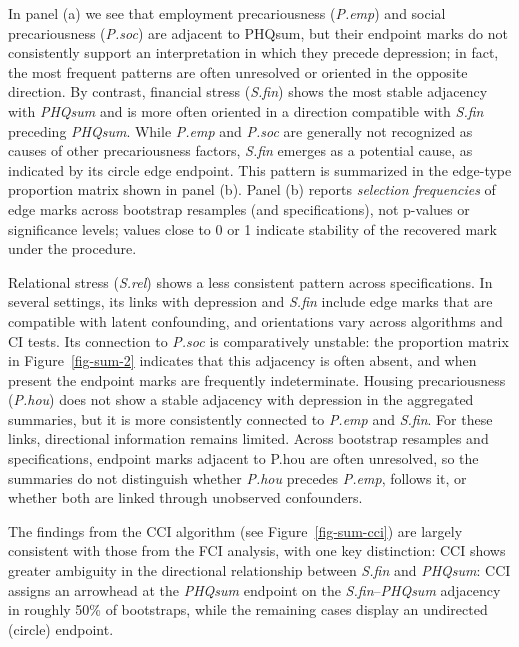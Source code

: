 \documentclass[
]{article}
\begin{document}
\textcolor{BrickRed}{In panel (a) we see that employment precariousness (\textit{P.emp}) and social precariousness (\textit{P.soc}) are adjacent to PHQsum, but their endpoint marks do not consistently support an interpretation in which they precede depression; in fact, the most frequent patterns are often unresolved or oriented in the opposite direction. By contrast, financial stress (\textit{S.fin}) shows the most stable adjacency with \textit{PHQsum} and is more often oriented in a direction compatible with \textit{S.fin} preceding \textit{PHQsum}.}
While \emph{P.emp} and \emph{P.soc} are generally not recognized as
causes of other precariousness factors, \emph{S.fin} emerges as a
potential cause, as indicated by its circle edge endpoint.
\textcolor{BrickRed}{This pattern is summarized in the edge-type proportion matrix shown in panel (b). Panel (b) reports \emph{selection frequencies} of edge marks across bootstrap resamples (and specifications), not p-values or significance levels; values close to 0 or 1 indicate stability of the recovered mark under the procedure.}

\textcolor{BrickRed}{Relational stress (\textit{S.rel}) shows a less consistent pattern across specifications. In several settings, its links with depression and \textit{S.fin} include edge marks that are compatible with latent confounding, and orientations vary across algorithms and CI tests. Its connection to \textit{P.soc} is comparatively unstable: the proportion matrix in}
Figure~\ref{fig-sum-2}
\textcolor{BrickRed}{indicates that this adjacency is often absent, and when present the endpoint marks are frequently indeterminate. Housing precariousness (\textit{P.hou}) does not show a stable adjacency with depression in the aggregated summaries, but it is more consistently connected to \textit{P.emp} and \textit{S.fin}. For these links, directional information remains limited. Across bootstrap resamples and specifications, endpoint marks adjacent to P.hou are often unresolved, so the summaries do not distinguish whether \textit{P.hou} precedes \textit{P.emp}, follows it, or whether both are linked through unobserved confounders.}

The findings from the CCI algorithm (see Figure~\ref{fig-sum-cci}) are
largely consistent with those from the FCI analysis, with one key
distinction: CCI shows greater ambiguity in the directional relationship
between \emph{S.fin} and \emph{PHQsum}:
\textcolor{BrickRed}{CCI assigns an arrowhead at the \textit{PHQsum} endpoint on the \textit{S.fin}–\textit{PHQsum} adjacency in roughly 50\% of bootstraps, while the remaining cases display an undirected (circle) endpoint.}
\end{document}
